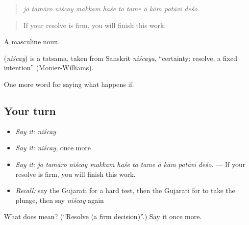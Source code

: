 \begin{quote}
\emph{jo tamāro niścay makkam haśe to tame ā kām patāvī deśo.}
\end{quote}

\begin{quote}
If your resolve is firm, you will finish this work.
\end{quote}

A masculine noun.

\begin{cousinweb}
\textbf{} (\emph{niścay}) is a tatsama, taken from Sanskrit \emph{niścaya}, \textquotedblleft{}certainty; resolve, a fixed intention\textquotedblright{} (Monier-Williams).
\end{cousinweb}

\begin{grammarlens}[title={What you've built}]
One more word for saying what happens if.
\end{grammarlens}

\subsection*{Your turn}
\begin{itemize}
\raggedright
  \item \emph{Say it:} \emph{niścay}
  \item \emph{Say it:} \emph{niścay}, once more
  \item \emph{Say it:} \emph{jo tamāro niścay makkam haśe to tame ā kām patāvī deśo.} — If your resolve is firm, you will finish this work.
  \item \emph{Recall:} say the Gujarati for a hard test, then the Gujarati for to take the plunge, then say \emph{niścay} again
\end{itemize}

\begin{tcolorbox}[breakable,colback=teal!4,colframe=teal!35!black,title={Before you move on}]
What does  mean? (\textquotedblleft{}Resolve (a firm decision)\textquotedblright{}.) Say it once more.
\end{tcolorbox}
